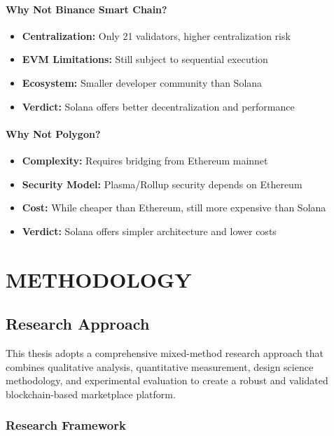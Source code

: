 \documentclass[a4paper,13pt,twoside]{report}
\theoremstyle{definition}
\begin{document}
\subsubsection{Why Not Binance Smart Chain?}

\begin{itemize}
    \item \textbf{Centralization:} Only 21 validators, higher centralization risk
    \item \textbf{EVM Limitations:} Still subject to sequential execution
    \item \textbf{Ecosystem:} Smaller developer community than Solana
    \item \textbf{Verdict:} Solana offers better decentralization and performance
\end{itemize}

\subsubsection{Why Not Polygon?}

\begin{itemize}
    \item \textbf{Complexity:} Requires bridging from Ethereum mainnet
    \item \textbf{Security Model:} Plasma/Rollup security depends on Ethereum
    \item \textbf{Cost:} While cheaper than Ethereum, still more expensive than Solana
    \item \textbf{Verdict:} Solana offers simpler architecture and lower costs
\end{itemize}

\newpage
\chapter{METHODOLOGY}
\label{chapter:Methodology}

\section{Research Approach}

This thesis adopts a comprehensive mixed-method research approach that combines qualitative analysis, quantitative measurement, design science methodology, and experimental evaluation to create a robust and validated blockchain-based marketplace platform.

\subsection{Research Framework}
\end{document}
